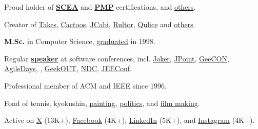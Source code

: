 \documentclass{yb}
\begin{document}
Proud holder of \textbf{\href{https://github.com/yegor256/blog/blob/master/pdf/certifications/OCMJEA-Feb11.pdf}{SCEA}} and
  \textbf{\href{https://github.com/yegor256/blog/blob/master/pdf/certifications/PMP-Jun07.pdf}{PMP}} certifications,
  and \href{https://github.com/yegor256/blog/tree/master/pdf/certifications}{others}.

Creator of \href{https://www.takes.org}{Takes},
  \href{https://www.cactoos.org}{Cactoos},
  \href{https://www.jcabi.com}{JCabi},
  \href{https://www.rultor.com}{Rultor},
  \href{https://www.qulice.com}{Qulice} and
  \href{https://www.yegor256.com/pets.html}{others}.

\textbf{M.Sc.} in Computer Science,
  \href{https://en.wikipedia.org/wiki/Oles_Honchar_Dnipro_National_University}{graduated} in 1998.

Regular \textbf{\href{https://www.yegor256.com/talks.html}{speaker}}
  at software conferences, incl.
  \href{https://youtu.be/55mwAbuDrV8}{Joker},
  \href{https://www.youtube.com/watch?v=20QBvrHq6TA}{JPoint},
  \href{https://vimeo.com/177215750}{GeeCON},
  \href{https://www.youtube.com/watch?v=TLM9eN0b6zo}{AgileDays},
  \href{https://www.youtube.com/watch?v=03PXmPc7Q3g}{},
  \href{https://www.youtube.com/watch?v=7yTIWFZrXpg}{GeekOUT},
  \href{https://www.youtube.com/watch?v=vU_x6oK437I}{NDC},
  \href{https://www.youtube.com/watch?v=GS45LzE3LPQ}{JEEConf}.

Professional member of ACM and IEEE since 1996.

Fond of
  tennis,
  kyokushin,
  \href{https://www.yegor256.com/paintings.html}{painting},
  \href{https://ru.yegor256.com}{politics},
  and
  \href{https://www.imdb.com/name/nm15660607}{film making}.

Active on
  \href{https://twitter.com/intent/follow?screen_name=yegor256}{X} (13K+),
  \href{https://www.facebook.com/yegor256}{Facebook} (4K+),
  \href{https://www.linkedin.com/in/yegor256}{LinkedIn} (5K+),
  and
  \href{https://instagram.com/yegor256}{Instagram} (4K+).
\end{document}
